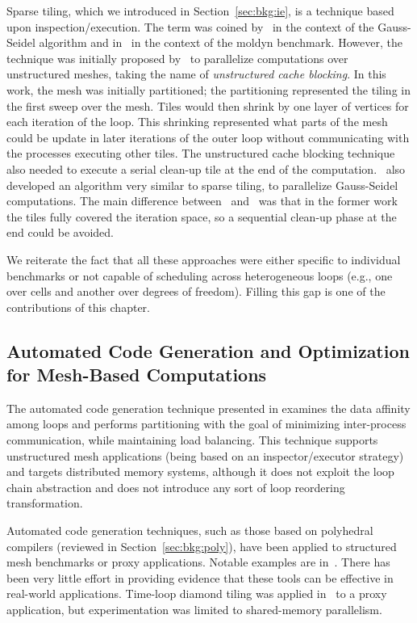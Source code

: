 Sparse tiling, which we introduced in Section~\ref{sec:bkg:ie}, is a technique based upon inspection/execution. The term was coined by~\cite{ST-StroutLCPC2002,ST-StroutIJHPCA} in the context of the Gauss-Seidel algorithm and in~\cite{ST-StroutPLDI03} in the context of the moldyn benchmark. However, the technique was initially proposed by~\cite{ST-dimeEtna00} to parallelize computations over unstructured meshes, taking the name of \textit{unstructured cache blocking}. In this work, the mesh was initially partitioned; the partitioning represented the tiling in the first sweep over the mesh. Tiles would then shrink by one layer of vertices for each iteration of the loop. This shrinking represented what parts of the mesh could be update in later iterations of the outer loop without communicating with the processes executing other tiles. The unstructured cache blocking technique also needed to execute a serial clean-up tile at the end of the computation.~\cite{ST-Adams99c} also developed an algorithm very similar to sparse tiling, to parallelize Gauss-Seidel computations. The main difference between~\cite{ST-StroutLCPC2002,ST-StroutIJHPCA} and~\cite{ST-dimeEtna00} was that in the former work the tiles fully covered the iteration space, so a sequential clean-up phase at the end could be avoided. 

We reiterate the fact that all these approaches were either specific to individual benchmarks or not capable of scheduling across heterogeneous loops (e.g., one over cells and another over degrees of freedom). Filling this gap is one of the contributions of this chapter.

\subsection*{Automated Code Generation and Optimization for Mesh-Based Computations}
The automated code generation technique presented in \cite{ST-OhioStateMPICodeGen} examines the data affinity among loops and performs partitioning with the goal of minimizing inter-process communication, while maintaining load balancing. This technique supports unstructured mesh applications (being based on an inspector/executor strategy) and targets distributed memory systems, although it does not exploit the loop chain abstraction and does not introduce any sort of loop reordering transformation.

Automated code generation techniques, such as those based on polyhedral compilers (reviewed in Section~\ref{sec:bkg:poly}), have been applied to structured mesh benchmarks or proxy applications. Notable examples are in~\cite{pluto,polly,loopy}. There has been very little effort in providing evidence that these tools can be effective in real-world applications. Time-loop diamond tiling was applied in~\cite{cohen-timetiling} to a proxy application, but experimentation was limited to shared-memory parallelism.


